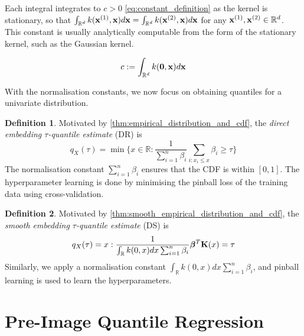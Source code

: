 \documentclass[twoside]{article} \usepackage{aistats2017}
\theoremstyle{definition}
\newtheorem{definition}{Definition}[section]
\theoremstyle{theorem}
\newcommand{\rv}[1]{{#1}}
\begin{document}
		Each integral integrates to $c > 0$ \eqref{eq:constant_definition} as the kernel is stationary, so that $\int_{\mathbb{R}^{d}} k(\mathbf{x}^{(1)}, \mathbf{x}) d\mathbf{x} = \int_{\mathbb{R}^{d}} k(\mathbf{x}^{(2)}, \mathbf{x}) d\mathbf{x}$ for any $\mathbf{x}^{(1)}, \mathbf{x}^{(2)} \in \mathbb{R}^{d}$. This constant is usually analytically computable from the form of the stationary kernel, such as the Gaussian kernel.
		
		\begin{equation}
			c := \int_{\mathbb{R}^{d}} k(\mathbf{0}, \mathbf{x}) d\mathbf{x}
		\label{eq:constant_definition}
		\end{equation}
		
		With the normalisation constants, we now focus on obtaining quantiles for a univariate distribution.

		\theoremstyle{definition}
		\begin{definition}
			Motivated by \cref{thm:empirical_distribution_and_cdf}, the \textit{direct embedding $\tau$-quantile estimate} (DR) is
			\begin{equation}
			q_{\rv{X}}(\tau) = \min\{x \in \mathbb{R} : \frac{1}{\sum_{i = 1}^{n} \beta_{i}} \sum_{i : x_{i} \leq x} \beta_{i} \geq \tau\}
			\end{equation}	
			The normalisation constant $\sum_{i = 1}^{n} \beta_{i}$ ensures that the CDF is within $[0, 1]$. The hyperparameter learning is done by minimising the pinball loss of the training data using cross-validation.
		\end{definition}
		
		\theoremstyle{definition}
		\begin{definition}
			Motivated by \cref{thm:smooth_empirical_distribution_and_cdf}, the \textit{smooth embedding $\tau$-quantile estimate} (DS) is
			\begin{equation}
			q_{\rv{X}}(\tau) = x : \frac{1}{\int_{\mathbb{R}} k(0, x) dx \sum_{i = 1}^{n} \beta_{i}} \bm{\beta}^{T} \bvec{K}(x) = \tau
			\end{equation}	
			Similarly, we apply a normalisation constant $\int_{\mathbb{R}} k(0, x) dx \sum_{i = 1}^{n} \beta_{i}$, and pinball learning is used to learn the hyperparameters.
		\end{definition}
	
\section{Pre-Image Quantile Regression}
	\label{sec:pre_image_quantile_regression}
\end{document}
